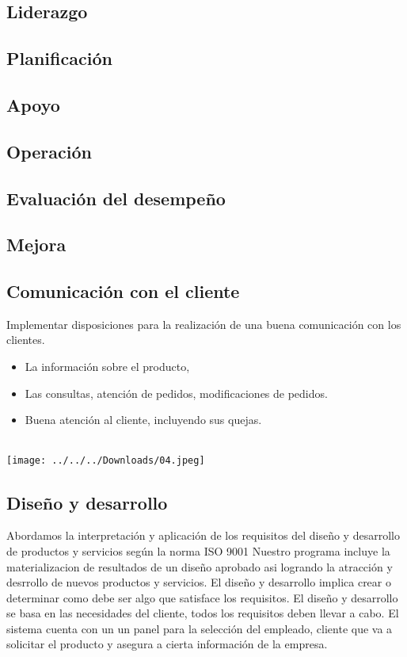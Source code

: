 \documentclass[12pt,a4paper]{article}
\begin{document}
\subsection{Liderazgo}
\subsection{Planificación}
\subsection{Apoyo}
\subsection{Operación}
\subsection{Evaluación del desempeño}
\subsection{Mejora}

\subsection{Comunicación con el cliente}
Implementar disposiciones para la realización de una buena comunicación con  los clientes.
\begin{itemize}
\item La información sobre el producto,
\item Las consultas, atención de pedidos, modificaciones de pedidos.
\item Buena atención al cliente, incluyendo sus quejas.\\\\
\end{itemize}
\begin{center}
\texttt{[image: ../../../Downloads/04.jpeg]} \end{center}

\subsection{Diseño y desarrollo}
Abordamos la interpretación y aplicación de los requisitos del diseño y desarrollo de productos y servicios según la norma ISO 9001  
Nuestro programa incluye la materializacion de resultados de un diseño aprobado asi logrando la atracción y desrrollo de nuevos productos y servicios. El diseño y desarrollo implica crear o determinar como debe ser algo que satisface los requisitos. El diseño y desarrollo se basa en las necesidades del cliente, todos los requisitos deben llevar a cabo. El sistema cuenta con un un panel para la selección del empleado, cliente que va a solicitar el producto y asegura a cierta información de la empresa.\\\\
\end{document}

